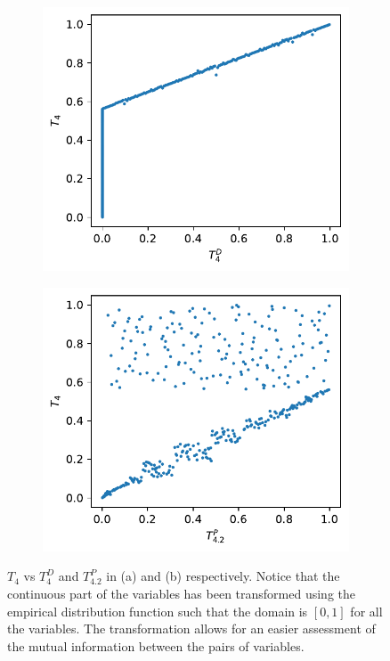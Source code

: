 \documentclass[../Thesis.tex]{subfiles}
\begin{document}
\begin{figure}[ht]
    \centering
    \begin{subfigure}[t]{0.49\linewidth}
        \includegraphics[width = \linewidth]{figures/Cycle data/G_dir complete - symmetric - TD4 vs T4.pdf}
        \caption{}
    \end{subfigure}
    \hfill
    \begin{subfigure}[t]{0.49\linewidth}
        \includegraphics[width = \linewidth]{figures/Cycle data/G_dir complete - symmetric - TP4 vs T4.pdf}
        \caption{}
    \end{subfigure}
    \caption{$T_4$ vs $T^D_4$ and $T^P_{4.2}$ in (a) and (b) respectively. Notice that the continuous part of the variables has been transformed using the empirical distribution function such that the domain is $[0,1]$ for all the variables. The transformation allows for an easier assessment of the mutual information between the pairs of variables.}
\end{figure}
\end{document}

